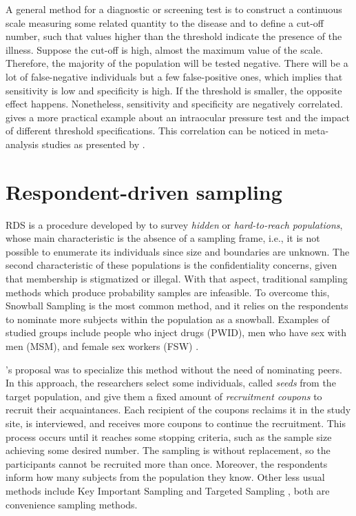 A general method for a diagnostic or screening test is to construct a
continuous scale measuring some related quantity to the disease and to define
a cut-off number, such that values higher than the threshold indicate the
presence of the illness. Suppose the cut-off is high, almost the maximum value
of the scale. Therefore, the majority of the population will be tested
negative. There will be a lot of false-negative individuals but a few
false-positive ones, which implies that sensitivity is low and specificity is
high. If the threshold is smaller, the opposite effect happens. Nonetheless,
sensitivity and specificity are negatively correlated. \textcite[p.
46]{parikh2008understanding} gives a more practical example about an
intraocular pressure test and the impact of different threshold
specifications. This correlation
can be noticed in meta-analysis studies as presented by \textcite[p. 1]{guo2017bayesian}.

\section{Respondent-driven sampling}
\label{sec:respodent_driven_sampling}

RDS is a procedure developed by 
\textcite{heckathorn1997} to survey {\em hidden} or {\em hard-to-reach
populations}, whose main characteristic is the absence of a sampling frame,
i.e., it is not possible to enumerate its individuals since size and boundaries
are unknown. The second characteristic of these populations is the
confidentiality concerns, given that membership is stigmatized or illegal.
With that aspect, traditional sampling methods which produce probability
samples are infeasible. To overcome this, Snowball Sampling \cite[]{goodman1961}
is the most common method, and it relies on the respondents to nominate more 
subjects within the population as a snowball. Examples of studied groups
include people who inject drugs (PWID), men who have sex with men (MSM), and
female sex workers (FSW) \cite[p. 66]{gile2018methods}. 

\textcite{heckathorn1997}'s proposal was to specialize this method without the need of
nominating peers. In this approach, the researchers select some individuals,
called {\em seeds} from the target population, and give them a fixed amount of
{\em recruitment coupons} to recruit their acquaintances. Each recipient of the coupons
reclaims it in the study site, is interviewed, and receives more coupons to
continue the recruitment. This process occurs until it reaches some stopping
criteria, such as the sample size achieving some desired number. The sampling
is without replacement, so the participants cannot be recruited more than
once. Moreover, the respondents inform how many subjects from the population
they know. Other less usual methods include Key Important Sampling \cite{deaux-callaghan1985}
and Targeted Sampling \cite{watters-biernacki1989}, both are convenience
sampling methods. 

